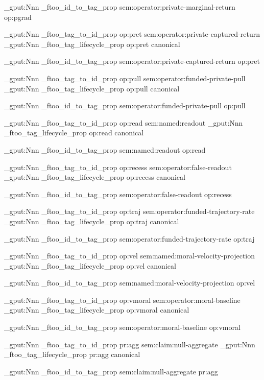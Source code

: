 \prop_gput:Nnn \g_ftoo_id_to_tag_prop { sem:operator:private-marginal-return } { op:pgrad }


\prop_gput:Nnn \g_ftoo_tag_to_id_prop { op:pret } { sem:operator:private-captured-return }
\prop_gput:Nnn \g_ftoo_tag_lifecycle_prop { op:pret } { canonical }

\prop_gput:Nnn \g_ftoo_id_to_tag_prop { sem:operator:private-captured-return } { op:pret }


\prop_gput:Nnn \g_ftoo_tag_to_id_prop { op:pull } { sem:operator:funded-private-pull }
\prop_gput:Nnn \g_ftoo_tag_lifecycle_prop { op:pull } { canonical }

\prop_gput:Nnn \g_ftoo_id_to_tag_prop { sem:operator:funded-private-pull } { op:pull }


\prop_gput:Nnn \g_ftoo_tag_to_id_prop { op:read } { sem:named:readout }
\prop_gput:Nnn \g_ftoo_tag_lifecycle_prop { op:read } { canonical }

\prop_gput:Nnn \g_ftoo_id_to_tag_prop { sem:named:readout } { op:read }


\prop_gput:Nnn \g_ftoo_tag_to_id_prop { op:recess } { sem:operator:false-readout }
\prop_gput:Nnn \g_ftoo_tag_lifecycle_prop { op:recess } { canonical }

\prop_gput:Nnn \g_ftoo_id_to_tag_prop { sem:operator:false-readout } { op:recess }


\prop_gput:Nnn \g_ftoo_tag_to_id_prop { op:traj } { sem:operator:funded-trajectory-rate }
\prop_gput:Nnn \g_ftoo_tag_lifecycle_prop { op:traj } { canonical }

\prop_gput:Nnn \g_ftoo_id_to_tag_prop { sem:operator:funded-trajectory-rate } { op:traj }


\prop_gput:Nnn \g_ftoo_tag_to_id_prop { op:vel } { sem:named:moral-velocity-projection }
\prop_gput:Nnn \g_ftoo_tag_lifecycle_prop { op:vel } { canonical }

\prop_gput:Nnn \g_ftoo_id_to_tag_prop { sem:named:moral-velocity-projection } { op:vel }


\prop_gput:Nnn \g_ftoo_tag_to_id_prop { op:vmoral } { sem:operator:moral-baseline }
\prop_gput:Nnn \g_ftoo_tag_lifecycle_prop { op:vmoral } { canonical }

\prop_gput:Nnn \g_ftoo_id_to_tag_prop { sem:operator:moral-baseline } { op:vmoral }


\prop_gput:Nnn \g_ftoo_tag_to_id_prop { pr:agg } { sem:claim:null-aggregate }
\prop_gput:Nnn \g_ftoo_tag_lifecycle_prop { pr:agg } { canonical }

\prop_gput:Nnn \g_ftoo_id_to_tag_prop { sem:claim:null-aggregate } { pr:agg }


